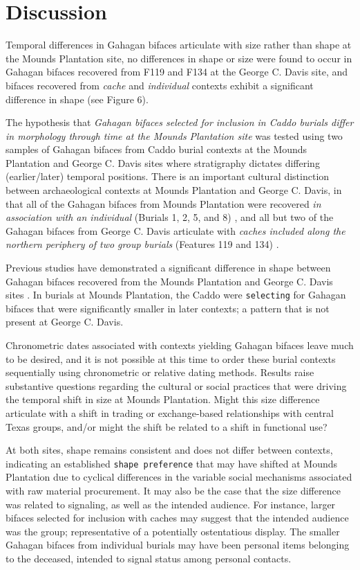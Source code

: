 \documentclass[]{interact}
\theoremstyle{plain}%
\theoremstyle{definition}
\theoremstyle{remark}
\begin{document}
\hypertarget{discussion}{%
\section{Discussion}\label{discussion}}

Temporal differences in Gahagan bifaces articulate with size rather than
shape at the Mounds Plantation site, no differences in shape or size
were found to occur in Gahagan bifaces recovered from F119 and F134 at
the George C. Davis site, and bifaces recovered from \emph{cache} and
\emph{individual} contexts exhibit a significant difference in shape
(see Figure 6).

The hypothesis that \emph{Gahagan bifaces selected for inclusion in
Caddo burials differ in morphology through time at the Mounds Plantation
site} was tested using two samples of Gahagan bifaces from Caddo burial
contexts at the Mounds Plantation and George C. Davis sites where
stratigraphy dictates differing (earlier/later) temporal positions.
There is an important cultural distinction between archaeological
contexts at Mounds Plantation and George C. Davis, in that all of the
Gahagan bifaces from Mounds Plantation were recovered \emph{in
association with an individual} (Burials 1, 2, 5, and 8) \citep{RN8174},
and all but two of the Gahagan bifaces from George C. Davis articulate
with \emph{caches included along the northern periphery of two group
burials} (Features 119 and 134) \citep{RN5746, RN8186}.

Previous studies have demonstrated a significant difference in shape
between Gahagan bifaces recovered from the Mounds Plantation and George
C. Davis sites \citep{RN8154}. In burials at Mounds Plantation, the
Caddo were \texttt{selecting} for Gahagan bifaces that were
significantly smaller in later contexts; a pattern that is not present
at George C. Davis.

Chronometric dates associated with contexts yielding Gahagan bifaces
leave much to be desired, and it is not possible at this time to order
these burial contexts sequentially using chronometric or relative dating
methods. Results raise substantive questions regarding the cultural or
social practices that were driving the temporal shift in size at Mounds
Plantation. Might this size difference articulate with a shift in
trading or exchange-based relationships with central Texas groups,
and/or might the shift be related to a shift in functional use?

At both sites, shape remains consistent and does not differ between
contexts, indicating an established \texttt{shape\ preference} that may
have shifted at Mounds Plantation due to cyclical differences in the
variable social mechanisms associated with raw material procurement. It
may also be the case that the size difference was related to signaling,
as well as the intended audience. For instance, larger bifaces selected
for inclusion with caches may suggest that the intended audience was the
group; representative of a potentially ostentatious display. The smaller
Gahagan bifaces from individual burials may have been personal items
belonging to the deceased, intended to signal status among personal
contacts.
\end{document}
